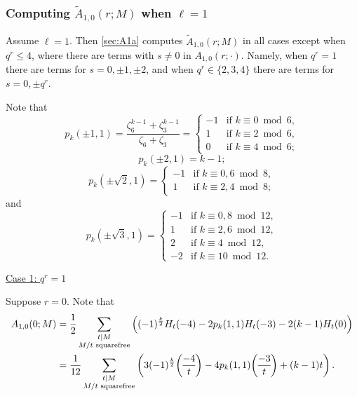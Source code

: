 \documentclass[11pt]{amsart}
\renewcommand{\mod}{\bmod}
\newcommand{\bigdot}{\boldsymbol{\cdot}}
\newcommand{\leg}{\overwithdelims ()}
\numberwithin{lem}{section}
\theoremstyle{remark}
\theoremstyle{definition}
\numberwithin{equation}{section}
\begin{document}
\subsubsection{Computing $\tilde A_{1,0}(r;M)$ when $\ell = 1$}
Assume $\ell = 1$.  Then \cref{sec:A1a} computes $\tilde A_{1,0}(r; M)$ in all cases except when $q^r \le 4$, where there are terms with $s \ne 0$ in $A_{1,0}(r; \bigdot)$.  Namely, when $q^r = 1$ there are terms for $s = 0, \pm 1, \pm 2$, and 
when $q^r \in \{ 2, 3, 4 \}$ there are terms for $s = 0, \pm q^r$. 

Note that
\[ p_k(\pm 1, 1) = \frac{\zeta_6^{k-1} + \zeta_3^{k-1}}{\zeta_6+\zeta_3} =
\begin{cases}
-1 & \text{if }k \equiv 0 \mod 6, \\
1 & \text{if }k \equiv 2 \mod 6, \\
0 & \text{if }k \equiv 4 \mod 6;
\end{cases} \]
\[ p_k(\pm 2, 1) = k-1; \]
\[ p_k(\pm \sqrt 2, 1) =  
\begin{cases}
-1 & \text{if }k \equiv 0, 6 \mod 8, \\
1 & \text{if }k \equiv 2, 4 \mod 8;
\end{cases} \]
and
\[ p_k(\pm \sqrt 3, 1) =  \begin{cases}
-1 & \text{if }k \equiv 0, 8 \mod 12, \\
1 & \text{if }k \equiv 2, 6 \mod 12, \\
2 & \text{if }k \equiv 4 \mod 12, \\
-2 & \text{if }k \equiv 10 \mod 12.
\end{cases} \]




\medskip
\noindent
\underline{Case 1: $q^r = 1$}

Suppose $r=0$.  Note that
\begin{align*} A_{1,0}(0; M) &= \frac 12 \sum_{\substack{t \mid M \\ M/t \text{ squarefree}}} 
\left( (-1)^{\frac k2} H_t(-4) - 2 p_k(1,1) H_t(-3) - 2(k-1) H_t(0) \right) \\
&= \frac 1{12} \sum_{\substack{t \mid M \\ M/t \text{ squarefree}}} 
\left( 3(-1)^{\frac k2} {-4 \leg t}  - 4 p_k(1,1) {-3 \leg t} + (k-1)t \right).
\end{align*}
\end{document}
